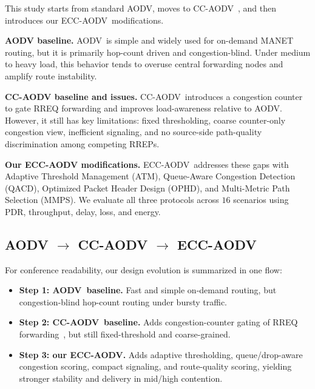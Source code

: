 \documentclass[11pt,a4paper]{article}
\newcommand{\ecc}{ECC-AODV}
\newcommand{\cca}{CC-AODV}
\newcommand{\aodv}{AODV}
\begin{document}
This study starts from standard \aodv, moves to \cca~\cite{ccaodv}, and then
introduces our \ecc\ modifications.

\textbf{AODV baseline.}
\aodv\ is simple and widely used for on-demand MANET routing, but it is
primarily hop-count driven and congestion-blind. Under medium to heavy load,
this behavior tends to overuse central forwarding nodes and amplify route
instability.

\textbf{CC-AODV baseline and issues.}
\cca\ introduces a congestion counter to gate RREQ forwarding and improves
load-awareness relative to \aodv. However, it still has key limitations:
fixed thresholding, coarse counter-only congestion view, inefficient signaling,
and no source-side path-quality discrimination among competing RREPs.

\textbf{Our ECC-AODV modifications.}
\ecc\ addresses these gaps with Adaptive Threshold Management (ATM),
Queue-Aware Congestion Detection (QACD), Optimized Packet Header Design (OPHD),
and Multi-Metric Path Selection (MMPS). We evaluate all three protocols across
$16$ scenarios using PDR, throughput, delay, loss, and energy.

\subsection{AODV $\rightarrow$ CC-AODV $\rightarrow$ ECC-AODV}

For conference readability, our design evolution is summarized in one flow:
\begin{itemize}
    \item \textbf{Step 1: \aodv\ baseline.} Fast and simple on-demand routing,
        but \textcolor{lightred!50!black}{congestion-blind hop-count routing}
        under bursty traffic.
    \item \textbf{Step 2: \cca\ baseline.} Adds congestion-counter gating of
        RREQ forwarding~\cite{ccaodv}, but still
            \textcolor{lightred!80!black}{fixed-threshold and coarse-grained}.
    \item \textbf{Step 3: our \ecc.} Adds adaptive thresholding, queue/drop-aware
        congestion scoring, compact signaling, and route-quality scoring,
        yielding \textcolor{ecccol}{stronger stability and delivery in mid/high contention}.
\end{itemize}


\end{document}
